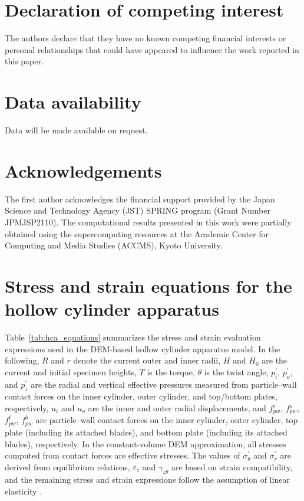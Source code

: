 \documentclass[a4paper,fleqn]{cas-sc}
\begin{document}
\section*{Declaration of competing interest}
The authors declare that they have no known competing financial interests or
personal relationships that could have appeared to influence the work reported
in this paper.

\section*{Data availability}
Data will be made available on request.

\section*{Acknowledgements}
The first author acknowledges the financial support provided by the Japan Science and Technology Agency (JST) SPRING program (Grant Number JPMJSP2110). The computational results presented in this work were partially obtained using the supercomputing resources at the Academic Center for Computing and Media Studies (ACCMS), Kyoto University. 


\printcredits

\appendix
\section{Stress and strain equations for the hollow cylinder apparatus}
\label{sec:appendix_hca}

Table~\ref{tab:hca_equations} summarizes the stress and strain evaluation expressions used in the DEM-based hollow cylinder apparatus model. In the following, $R$ and $r$ denote the current outer and inner radii, $H$ and $H_0$ are the current and initial specimen heights, $T$ is the torque, $\theta$ is the twist angle, $p_i^{\prime}$, $p_o^{\prime}$, and $p_z^{\prime}$ are the radial and vertical effective pressures measured from particle--wall contact forces on the inner cylinder, outer cylinder, and top/bottom plates, respectively, $u_i$ and $u_o$ are the inner and outer radial displacements, and $f_{pw}^{i}$, $f_{pw}^{o}$, $f_{pw}^{t}$, $f_{pw}^{b}$ are particle--wall contact forces on the inner cylinder, outer cylinder, top plate (including its attached blades), and bottom plate (including its attached blades), respectively. In the constant-volume DEM approximation, all stresses computed from contact forces are effective stresses. The values of $\sigma_\theta^{\prime}$ and $\sigma_r^{\prime}$ are derived from equilibrium relations, $\varepsilon_z$ and $\gamma_{z\theta}$ are based on strain compatibility, and the remaining stress and strain expressions follow the assumption of linear elasticity \citep{Hight1983}.
\end{document}
